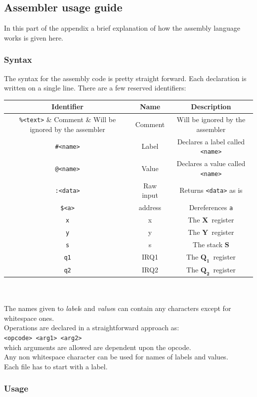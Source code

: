 \documentclass{article}
\newcommand{\V}{\verb}
\newcommand{\x}{$\textbf{X}$}
\newcommand{\y}{$\textbf{Y}$}
\newcommand{\s}{$\textbf{S}$}
\newcommand{\q}{$\textbf{Q}_{\textbf{1}}$}
\newcommand{\qq}{$\textbf{Q}_{\textbf{2}}$}
\begin{document}
\subsection{Assembler usage guide}

In this part of the appendix a brief explanation of how the assembly language
works is given here.
\subsubsection{Syntax}
The syntax for the assembly code is pretty straight forward. Each declaration is
written on a single line. There are a few reserved identifiers:

\begin{tabular}{|c | c| c |}
\hline
Identifier & Name & Description\\
\hline
\V+%
\hline
\V+#<name>+ & Label & Declares a label called \V+<name>+ \\
\hline
\V+@<name>+ & Value & Declares a value called \V+<name>+\\
\hline
\V+:<data>+ & Raw input & Returns \V+<data>+ as is \\
\hline
\verb+$<a>+ & address & Dereferences \V+a+\\
\hline
\V+x+ & x & The \x \ register \\
\hline
\V+y+ & y & The \y \ register \\
\hline
\V+s+ & s & The stack \s \\
\hline
\V+q1+ & IRQ1 & The \q \ register\\
\hline
\V+q2+ & IRQ2 & The \qq \ register\\
\hline
\end{tabular}
\\
\\
The names given to \emph{label}s and \emph{value}s can contain any characters except for
whitespace ones.\\
Operations are declared in a straightforward approach as:\\
\V+<opcode> <arg1> <arg2>+ \\
which arguments are allowed are dependent upon the opcode.\\
Any non whitespace character can be used for names of labels and values.\\
Each file has to start with a label.

\subsubsection{Usage}
\end{document}
